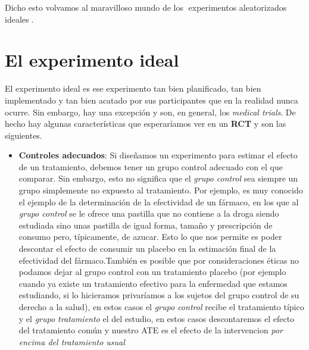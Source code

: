 \documentclass[
  letterpaper,
  DIV=11,
  numbers=noendperiod,
  oneside]{scrreprt}
\providecommand{\tightlist}{%
  \setlength{\itemsep}{0pt}\setlength{\parskip}{0pt}}\usepackage{longtable,booktabs,array}
\begin{document}
Dicho esto volvamos al maravilloso mundo de los 🌈experimentos
aleatorizados ideales🌈.

\hypertarget{el-experimento-ideal}{%
\section{El experimento ideal}\label{el-experimento-ideal}}

El experimento ideal es ese experimento tan bien planificado, tan bien
implementado y tan bien acatado por sus participantes que en la realidad
nunca ocurre. Sin embargo, hay una excepción y son, en general, los
\emph{medical trials}. De hecho hay algunas características que
esperaríamos ver en un \textbf{RCT} y son las siguientes.

\begin{itemize}
\tightlist
\item
  \textbf{Controles adecuados}: Si diseñamos un experimento para estimar
  el efecto de un tratamiento, debemos tener un grupo control adecuado
  con el que comparar. Sin embargo, esto no significa que el \emph{grupo
  control} sea siempre un grupo simplemente no expuesto al tratamiento.
  Por ejemplo, es muy conocido el ejemplo de la determinación de la
  efectividad de un fármaco, en los que al \emph{grupo control} se le
  ofrece una pastilla que no contiene a la droga siendo estudiada sino
  unas pastilla de igual forma, tamaño y prescripción de consumo pero,
  típicamente, de azucar. Esto lo que nos permite es poder descontar el
  efecto de consumir un placebo en la estimación final de la efectividad
  del fármaco.También
  es posible que por consideraciones éticas no podamos dejar al grupo
  control con un tratamiento placebo (por ejemplo cuando ya existe un
  tratamiento efectivo para la enfermedad que estamos estudiando, si lo
  hicieramos privaríamos a los sujetos del grupo control de su derecho a
  la salud), en estos casos el \emph{grupo control} recibe el
  tratamiento típico y el \emph{grupo tratamiento} el del estudio, en
  estos casos descontaremos el efecto del tratamiento común y nuestro
  ATE es el efecto de la intervencion \emph{por encima del tratamiento
  usual}
\end{itemize}
\end{document}
